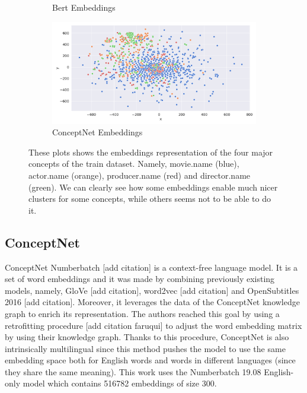 \documentclass[11pt,a4paper]{article}
\begin{document}
\begin{figure}[!ht]
\begin{subfigure}{0.5\linewidth}
  \caption{Bert Embeddings}
  \label{fig:sfig2}
\end{subfigure}%
\begin{subfigure}{0.5\linewidth}
  \centering
  \includegraphics[width=\linewidth]{img/conceptnet-embeddings.png}
  \caption{ConceptNet Embeddings}
  \label{fig:sfig2}
\end{subfigure}
\caption{These plots shows the embeddings representation of the four major concepts of the train dataset. Namely, movie.name (blue), actor.name (orange), producer.name (red) and director.name (green). We can clearly see how some embeddings enable much nicer clusters for some concepts, while others seems not to be able to do it.}
\label{fig:fig}
\end{figure}

\subsection{ConceptNet}
ConceptNet Numberbatch [add citation] is a context-free language model. It is a set of word embeddings and it was made by combining previously existing models, namely, GloVe [add citation], word2vec [add citation] and OpenSubtitles 2016 [add citation]. Moreover, it leverages the data of the ConceptNet knowledge graph to enrich its representation. The authors reached this goal by using a retrofitting procedure [add citation faruqui] to adjust the word embedding matrix by using their knowledge graph. Thanks to this procedure, ConceptNet is also intrinsically multilingual since this method pushes the model to use the same embedding space both for English words and words in different languages (since they share the same meaning).  This work uses the Numberbatch 19.08 English-only model which contains 516782 embeddings of size 300. 
\end{document}
